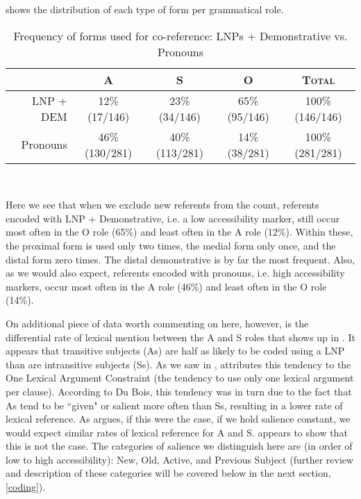  shows the distribution of each type of form per grammatical role.

\begin{table}[htp]
\begin{center}
\caption{\small{Frequency of forms used for co-reference: LNPs + Demonstrative vs. Pronouns}}
\begin{tabular}{| r | c | c | c | c |}\hline
 & \textsc{A} & \textsc{S} & \textsc{O} & \textsc{Total} \\
\hline
LNP + DEM & 12{\%} (17/146) & 23{\%} (34/146) & 65{\%} (95/146) & 100{\%} (146/146)  \\
\hline
Pronouns & 46{\%} (130/281) & 40{\%} (113/281) & 14{\%} (38/281) & 100{\%} (281/281)  \\
\hline
\end{tabular}\\
\label{coreferenceforms}
\end{center}
\end{table}
Here we see that when we exclude new referents from the count, referents encoded with LNP + Demonstrative, i.e. a low accessibility marker, still occur most often in the O role (65{\%}) and least often in the A role (12{\%}). Within these, the proximal form is used only two times, the medial form only once, and the distal form zero times. The distal demonstrative is by far the most frequent. Also, as we would also expect, referents encoded with pronouns, i.e. high accessibility markers, occur most often in the A role (46{\%}) and least often in the O role (14{\%}). 

On additional piece of data worth commenting on here, however, is the differential rate of lexical mention between the A and S roles that shows up in . It appears that transitive subjects (As) are half as likely to be coded using a LNP than are intransitive subjects (Ss). As we saw in , \citet{dubois1987} attributes this tendency to the One Lexical Argument Constraint (the tendency to use only one lexical argument per clause). According to Du Bois, this tendency was in turn due to the fact that As tend to be ``given" or salient more often than Ss, resulting in a lower rate of lexical reference. As \citet[237]{arnold2003} argues, if this were the case, if we hold salience constant, we would expect similar rates of lexical reference for A and S.  appears to show that this is not the case. The categories of salience we distinguish here are (in order of low to high accessibility): New, Old, Active, and Previous Subject (further review and description of these categories will be covered below in the next section, \ref{coding}). 

